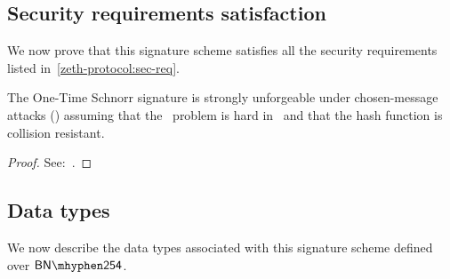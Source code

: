 \subsection{Security requirements satisfaction}

We now prove that this signature scheme satisfies all the security requirements listed in~\cref{zeth-protocol:sec-req}.

\begin{theorem}
    The One-Time Schnorr signature is strongly unforgeable under chosen-message attacks (\sufcma) assuming that the \omdlog~problem is hard in \gset~and that the hash function is collision resistant.

\begin{proof}
    See:~\cite[Theorems 5.1, 5.2 and 6.1]{bellare2007two}.
\end{proof}

\end{theorem}

\subsection{Data types}\label{instantiation:otsig:data-types}

We now describe the data types associated with this signature scheme defined over $\BNCurve$.

